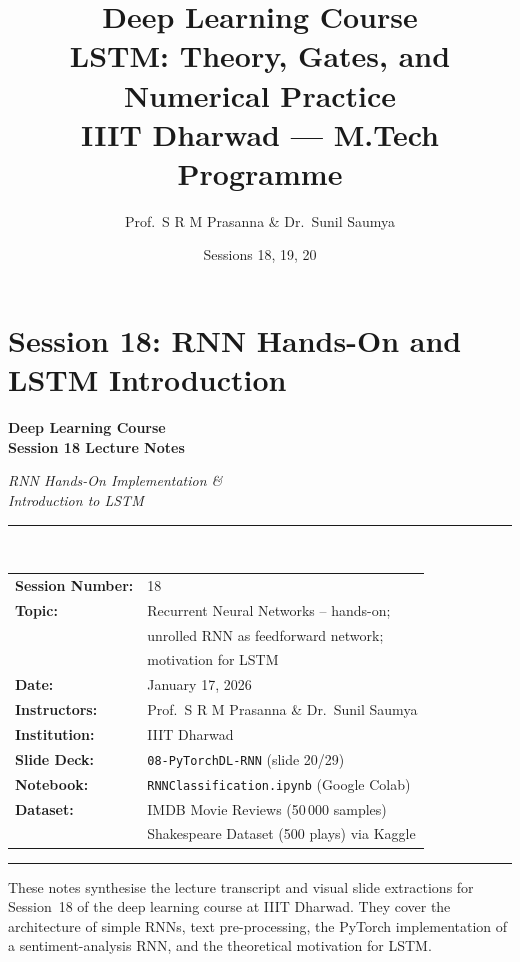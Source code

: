 \documentclass[12pt,a4paper]{article}
\title{%
  {\Large\bfseries Deep Learning Course}\\[6pt]
  {\LARGE LSTM: Theory, Gates, and Numerical Practice}\\[4pt]
  {\normalsize IIIT Dharwad --- M.Tech Programme}
}
\author{Prof.\ S R M Prasanna \& Dr.\ Sunil Saumya}
\date{Sessions 18, 19, 20}
\begin{document}
\maketitle
\tableofcontents
\clearpage

\part{Session 18: RNN Hands-On and LSTM Introduction}


\begin{titlepage}
  \centering
  \vspace*{2cm}
  {\Huge\bfseries Deep Learning Course\\[0.4em]
   Session 18 Lecture Notes\par}
  \vspace{1.2cm}
  {\LARGE\itshape RNN Hands-On Implementation \&\\[0.3em]
   Introduction to LSTM\par}
  \vspace{1.5cm}
  \rule{\linewidth}{0.6pt}\\[0.4cm]
  \begin{tabular}{ll}
    \textbf{Session Number:}  & 18 \\[4pt]
    \textbf{Topic:}           & Recurrent Neural Networks -- hands-on; \\
                              & unrolled RNN as feedforward network; \\
                              & motivation for LSTM \\[4pt]
    \textbf{Date:}            & January 17, 2026 \\[4pt]
    \textbf{Instructors:}     & Prof.\ S R M Prasanna \& Dr.\ Sunil Saumya \\[4pt]
    \textbf{Institution:}     & IIIT Dharwad \\[4pt]
    \textbf{Slide Deck:}      & \texttt{08-PyTorchDL-RNN} (slide 20/29) \\[4pt]
    \textbf{Notebook:}        & \texttt{RNNClassification.ipynb} (Google Colab) \\[4pt]
    \textbf{Dataset:}         & IMDB Movie Reviews (50\,000 samples) \\
                              & Shakespeare Dataset (500 plays) via Kaggle \\
  \end{tabular}
  \rule{\linewidth}{0.6pt}
  \vfill
  {\large These notes synthesise the lecture transcript and visual slide
   extractions for Session~18 of the deep learning course at IIIT Dharwad.
   They cover the architecture of simple RNNs, text pre-processing,
   the PyTorch implementation of a sentiment-analysis RNN, and the
   theoretical motivation for LSTM.\par}
\end{titlepage}
\end{document}
